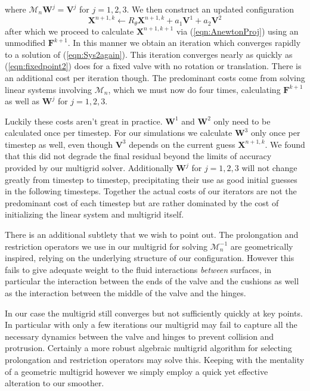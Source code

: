 \documentclass[preprint,12pt]{elsarticle}
\begin{document}
where $\mathcal{M}_n\mathbf{W}^j = \mathbf{V}^j$ for $j=1,2,3$.
We then construct an updated configuration 
\begin{equation}
\mathbf{X}^{n+1,k} \leftarrow R_{\theta}\mathbf{X}^{n+1,k}+a_1\mathbf{V}^1+a_2\mathbf{V}^2
\label{eqn:Rotate}
\end{equation}
after which we proceed to calculate $\mathbf{X}^{n+1,k+1}$ via (\ref{eqn:AnewtonProj}) using an unmodified $\mathbf{F}^{k+1}$.
In this manner we obtain an iteration which converges rapidly to a solution of (\ref{eqn:Sys2again}).
This iteration converges nearly as quickly as (\ref{eqn:fixedpoint2}) does for a fixed valve with no rotation or translation. There is an additional cost per iteration though. The predominant costs come from solving linear systems involving $\mathcal{M}_n$, which we must now do four times, calculating $\mathbf{F}^{k+1}$ as well as $\mathbf{W}^j$ for $j=1,2,3$.

Luckily these costs aren't great in practice. $\mathbf{W}^1$ and $\mathbf{W}^2$ only need to be calculated once per timestep. For our simulations we calculate $\mathbf{W}^3$ only once per timestep as well, even though $\mathbf{V}^3$ depends on the current guess $\mathbf{X}^{n+1,k}$. We found that this did not degrade the final residual beyond the limits of accuracy provided by our multigrid solver.
Additionally $\mathbf{W}^j$ for $j=1,2,3$ will not change greatly from timestep to timestep, precipitating their use as good initial guesses in the following timesteps. Together the actual costs of our iterators are not the predominant cost of each timestep but are rather dominated by the cost of initializing the linear system and multigrid itself.

There is an additional subtlety that we wish to point out. The prolongation and restriction operators we use in our multigrid for solving $\mathcal{M}_n^{-1}$ are geometrically inspired, relying on the underlying structure of our configuration. However this fails to give adequate weight to the fluid interactions \textit{between} surfaces, in particular the interaction between the ends of the valve and the cushions as well as the interaction between the middle of the valve and the hinges.

In our case the multigrid still converges but not sufficiently quickly at key points. In particular with only a few iterations our multigrid may fail to capture all the necessary dynamics between the valve and hinges to prevent collision and protrusion. Certainly a more robust algebraic multigrid algorithm for selecting prolongation and restriction operators may solve this. Keeping with the mentality of a geometric multigrid however we simply employ a quick yet effective alteration to our smoother.
\end{document}
